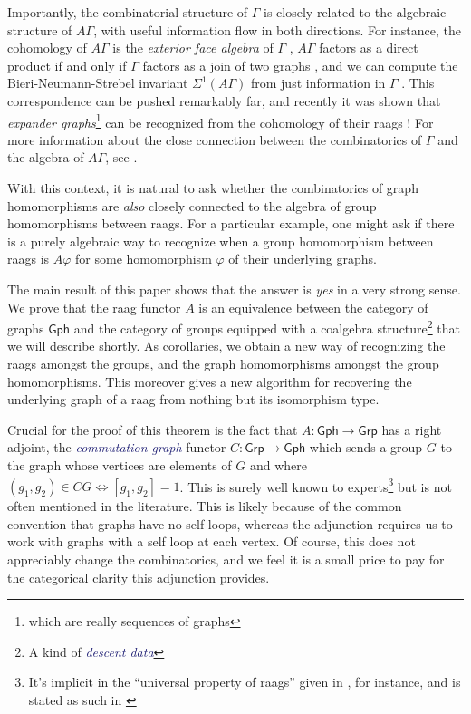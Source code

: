 \documentclass[12pt]{article}
\theoremstyle{definition}
\theoremstyle{theorem}
\newcommand*{\catFont}[1]{\mathsf{#1}}
\newcommand{\Grp}{\catFont{Grp}}
\newcommand*{\important}[1]{\textcolor{MidnightBlue}{\emph{#1}}}
\begin{document}
  Importantly, the combinatorial structure of $\Gamma$ is closely related to the 
  algebraic structure of $A \Gamma$, with useful information flow in both directions. 
  For instance, the cohomology of $A \Gamma$ is the \emph{exterior face algebra} 
  of $\Gamma$ \cite{sabalkaRigidityIsomorphismProblem2009},
  $A\Gamma$ factors as a direct product if and only if $\Gamma$ factors
  as a join of two graphs \cite{servatiusAutomorphismsGraphGroups1989},
  and we can compute the Bieri-Neumann-Strebel invariant $\Sigma^1(A\Gamma)$
  from just information in $\Gamma$ \cite{meierBieriNeumannStrebelInvariantsGraph1995}.
  This correspondence can be pushed remarkably far, and recently it was
  shown that \emph{expander graphs}\footnote{which are really sequences of graphs}
  can be recognized from the cohomology of their raags
  \cite{floresExpandersRightangledArtin2021}! For more information about the 
  close connection between the combinatorics of $\Gamma$ and the algebra of
  $A\Gamma$, see 
  \cite{floresExpandersRightangledArtin2021, koberdaGeometryCombinatoricsRightAngled2022}.
  
  With this context, it is natural to ask whether the combinatorics
  of graph homomorphisms are \emph{also} closely connected to the algebra of
  group homomorphisms between raags. For a particular example, one might ask 
  if there is a purely algebraic way to recognize when a group homomorphism 
  between raags is $A \varphi$ for some homomorphism $\varphi$ of their 
  underlying graphs.

  The main result of this paper shows
  that the answer is \emph{yes} in a very strong sense. We prove that the raag 
  functor $A$ is an equivalence between the category of graphs $\mathsf{Gph}$ 
  and the category of groups equipped with a 
  coalgebra structure\footnote{A kind of \important{descent data}}
  that we will describe shortly. As corollaries, we obtain a new way of
  recognizing the raags amongst the groups, and the graph homomorphisms 
  amongst the group homomorphisms. This moreover gives a new algorithm for 
  recovering the underlying graph of a raag from nothing but its isomorphism 
  type.

  Crucial for the proof of this theorem is the fact that 
  $A : \mathsf{Gph} \to \Grp$ has a right adjoint, the \important{commutation graph}
  functor $C : \Grp \to \mathsf{Gph}$ which sends a group $G$ to the graph 
  whose vertices are elements of $G$ and where $(g_1,g_2) \in CG \iff [g_1,g_2]=1$. 
  This is surely well known to 
  experts\footnote{It's implicit in the ``universal property of raags'' given 
  in \cite{koberdaRightangledArtinGroups2012}, for instance, and is stated as
  such in \cite{servatiusAutomorphismsGraphGroups1989}} but is not often 
  mentioned in the literature. This is likely because of the common convention that graphs 
  have no self loops, whereas the adjunction requires us to work with graphs
  with a self loop at each vertex. Of course, this does not appreciably 
  change the combinatorics, and we feel it is a small price to pay for the 
  categorical clarity this adjunction provides.
\end{document}
